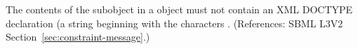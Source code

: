 The contents of the \Message subobject in a \Constraint object must not
contain an XML DOCTYPE declaration (\ie a string beginning with the
characters .  (References: SBML L3V2
Section~\ref{sec:constraint-message}.)
